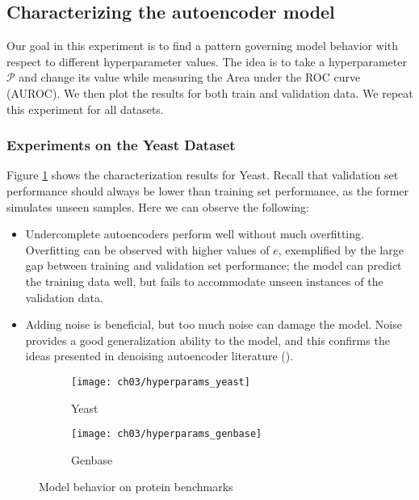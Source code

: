 \subsection{Characterizing the autoencoder model}
\label{SDExperimentsHyperparam}

Our goal in this experiment is to find a pattern governing model behavior
with respect to different hyperparameter values. The idea is to take a
hyperparameter $\mathcal{P}$ and change its value while measuring the Area
under the ROC curve (AUROC). We then plot the results for both train and
validation data. We repeat this experiment for all datasets.

\subsubsection{Experiments on the Yeast Dataset}
\label{SDExperimentsHyperparamYeast}

Figure \ref{results:sdae_char_yeast} shows the characterization results for
Yeast. Recall that validation set performance should always be lower than
training set performance, as the former simulates unseen samples. Here we can
observe the following:

\begin{itemize}
  \item Undercomplete autoencoders perform well without much overfitting.
      Overfitting can be observed with higher values of $e$, exemplified by the
      large gap between training and validation set performance; the model can
      predict the training data well, but fails to accommodate unseen instances
      of the validation data.
  \item Adding noise is beneficial, but too much noise can damage the model.
      Noise provides a good generalization ability to the model, and this
      confirms the ideas presented in denoising autoencoder literature
      (\cite{vincent2008denoising, vincent2010stacked}).
\end{itemize}
 
\begin{figure}[!t]
  \centering
  \begin{subfigure}[b]{0.48\textwidth}
    \texttt{[image: ch03/hyperparams\_yeast]}
    \caption{Yeast}
    \label{results:sdae_char_yeast}
  \end{subfigure}
  \begin{subfigure}[b]{0.48\textwidth}
    \texttt{[image: ch03/hyperparams\_genbase]}
    \caption{Genbase}
    \label{results:sdae_char_genbase}
  \end{subfigure}
  \caption{Model behavior on protein benchmarks}
  \label{results:sdae_char}
\end{figure}

